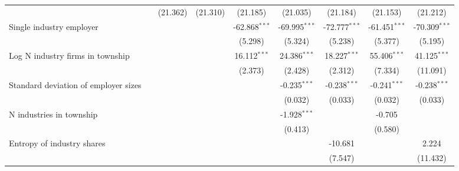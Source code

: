 \begin{tabular}{lcccccccc}
                                                         &                  & (21.362)        & (21.310)         & (21.185)         & (21.035)         & (21.184)         & (21.153)         & (21.212)\\   
   Single industry employer                              &                  &                 &                  & -62.868$^{***}$  & -69.995$^{***}$  & -72.777$^{***}$  & -61.451$^{***}$  & -70.309$^{***}$\\   
                                                         &                  &                 &                  & (5.298)          & (5.324)          & (5.238)          & (5.377)          & (5.195)\\   
   Log N industry firms in township                      &                  &                 &                  & 16.112$^{***}$   & 24.386$^{***}$   & 18.227$^{***}$   & 55.406$^{***}$   & 41.125$^{***}$\\   
                                                         &                  &                 &                  & (2.373)          & (2.428)          & (2.312)          & (7.334)          & (11.091)\\   
   Standard deviation of employer sizes                  &                  &                 &                  &                  & -0.235$^{***}$   & -0.238$^{***}$   & -0.241$^{***}$   & -0.238$^{***}$\\   
                                                         &                  &                 &                  &                  & (0.032)          & (0.033)          & (0.032)          & (0.033)\\   
   N industries in township                              &                  &                 &                  &                  & -1.928$^{***}$   &                  & -0.705           &   \\   
                                                         &                  &                 &                  &                  & (0.413)          &                  & (0.580)          &   \\   
   Entropy of industry shares                            &                  &                 &                  &                  &                  & -10.681          &                  & 2.224\\   
                                                         &                  &                 &                  &                  &                  & (7.547)          &                  & (11.432)\\   

\end{tabular}

